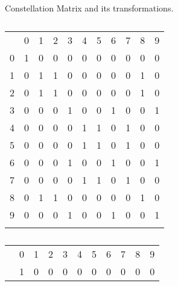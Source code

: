 \documentclass[conference]{IEEEtran}
\begin{document}
\begin{table*}
\renewcommand{\arraystretch}{1.2}
\centering
\caption{Constellation Matrix and its transformations.}
\begin{subtable}[b]{0.45\linewidth}
\hspace{4em}
	\begin{tabular}{c|c|c|c|c|c|c|c|c|c|c|}
	\multicolumn{1}{c}{}  &  \multicolumn{1}{c}{0} & \multicolumn{1}{c}{1} & 
	\multicolumn{1}{c}{2} &  \multicolumn{1}{c}{3} & \multicolumn{1}{c}{4} & 
	\multicolumn{1}{c}{5} &  \multicolumn{1}{c}{6} & \multicolumn{1}{c}{7} & 
	\multicolumn{1}{c}{8} &  \multicolumn{1}{c}{9} \\ \cline{2-11}
	0 & 1 & 0 & 0 & 0 & 0 & 0 & 0 & 0 & 0 & 0 \\ \cline{2-11}
	1 & 0 & 1 & 1 & 0 & 0 & 0 & 0 & 0 & 1 & 0 \\ \cline{2-11}
	2 & 0 & 1 & 1 & 0 & 0 & 0 & 0 & 0 & 1 & 0 \\ \cline{2-11}
	3 & 0 & 0 & 0 & 1 & 0 & 0 & 1 & 0 & 0 & 1 \\ \cline{2-11}
	4 & 0 & 0 & 0 & 0 & 1 & 1 & 0 & 1 & 0 & 0 \\ \cline{2-11}
	5 & 0 & 0 & 0 & 0 & 1 & 1 & 0 & 1 & 0 & 0 \\ \cline{2-11}
	6 & 0 & 0 & 0 & 1 & 0 & 0 & 1 & 0 & 0 & 1 \\ \cline{2-11}
	7 & 0 & 0 & 0 & 0 & 1 & 1 & 0 & 1 & 0 & 0 \\ \cline{2-11}
	8 & 0 & 1 & 1 & 0 & 0 & 0 & 0 & 0 & 1 & 0 \\ \cline{2-11}
	9 & 0 & 0 & 0 & 1 & 0 & 0 & 1 & 0 & 0 & 1 \\ \cline{2-11}
	\multicolumn{1}{c}{} & \multicolumn{1}{c}{} & \multicolumn{1}{c}{} & \multicolumn{1}{c}{} & \multicolumn{1}{c}{} & \multicolumn{1}{c}{} & \multicolumn{1}{c}{} & \multicolumn{1}{c}{} \\
	\end{tabular}	
	\caption{}
	\label{table:mat1}
\end{subtable}
\hspace{2em}
\begin{subtable}[b]{0.45\linewidth}
	\begin{tabular}{c|c|c|c|c|c|c|c|c|c|c|}
	\multicolumn{1}{c}{}  &  \multicolumn{1}{c}{0} & \multicolumn{1}{c}{1} & 
	\multicolumn{1}{c}{2} &  \multicolumn{1}{c}{3} & \multicolumn{1}{c}{4} & 
	\multicolumn{1}{c}{5} &  \multicolumn{1}{c}{6} & \multicolumn{1}{c}{7} & 
	\multicolumn{1}{c}{8} &  \multicolumn{1}{c}{9} \\ \cline{2-11}
	{\color{red} } & {\color{red} 1} & {\color{red} 0} & {\color{red} 0} & {\color{red} 0} & {\color{red} 0} & {\color{red} 0} & {\color{red} 0} & {\color{red} 0} & {\color{red} 0} & {\color{red} 0} \\ \cline{2-11}

\end{tabular}
\end{subtable}
\end{table*}
\end{document}
